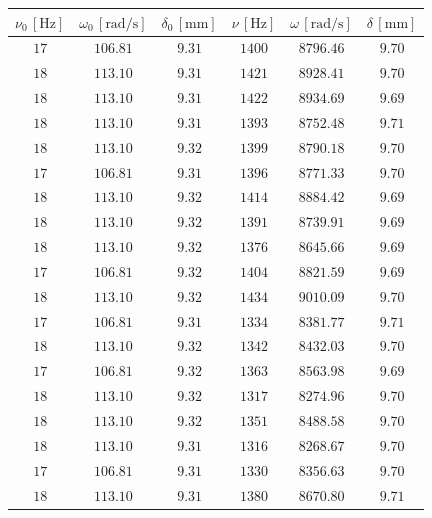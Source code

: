 \documentclass[]{article}
\begin{document}
    \begin{table}
        \centering
        \begin{tabular}{||c|c|c||c|c|c||}
            \hline
            $\nu_0 \, [\text{Hz}]$ & $\omega_0 \, [\text{rad/s}]$ &  $\delta_0 \,[\text{mm}]$ &  $\nu \,[\text{Hz}]$ & $\omega \,[\text{rad/s}]$ & $\delta \, [\text{mm}]$ \\
            \hline\hline
            $17$ & $106.81$ & $9.31$ & $1400$ & $8796.46$ & $9.70$ \\\hline
            $18$ & $113.10$ & $9.31$ & $1421$ & $8928.41$ & $9.70$ \\\hline
            $18$ & $113.10$ & $9.31$ & $1422$ & $8934.69$ & $9.69$ \\\hline
            $18$ & $113.10$ & $9.31$ & $1393$ & $8752.48$ & $9.71$ \\\hline
            $18$ & $113.10$ & $9.32$ & $1399$ & $8790.18$ & $9.70$ \\\hline
            $17$ & $106.81$ & $9.31$ & $1396$ & $8771.33$ & $9.70$ \\\hline
            $18$ & $113.10$ & $9.32$ & $1414$ & $8884.42$ & $9.69$ \\\hline
            $18$ & $113.10$ & $9.32$ & $1391$ & $8739.91$ & $9.69$ \\\hline
            $18$ & $113.10$ & $9.32$ & $1376$ & $8645.66$ & $9.69$ \\\hline
            $17$ & $106.81$ & $9.32$ & $1404$ & $8821.59$ & $9.69$ \\\hline
            $18$ & $113.10$ & $9.32$ & $1434$ & $9010.09$ & $9.70$ \\\hline
            $17$ & $106.81$ & $9.31$ & $1334$ & $8381.77$ & $9.71$ \\\hline
            $18$ & $113.10$ & $9.32$ & $1342$ & $8432.03$ & $9.70$ \\\hline
            $17$ & $106.81$ & $9.32$ & $1363$ & $8563.98$ & $9.69$ \\\hline
            $18$ & $113.10$ & $9.32$ & $1317$ & $8274.96$ & $9.70$ \\\hline
            $18$ & $113.10$ & $9.32$ & $1351$ & $8488.58$ & $9.70$ \\\hline
            $18$ & $113.10$ & $9.31$ & $1316$ & $8268.67$ & $9.70$ \\\hline
            $17$ & $106.81$ & $9.31$ & $1330$ & $8356.63$ & $9.70$ \\\hline
            $18$ & $113.10$ & $9.31$ & $1380$ & $8670.80$ & $9.71$ \\\hline

\end{tabular}
\end{table}
\end{document}
